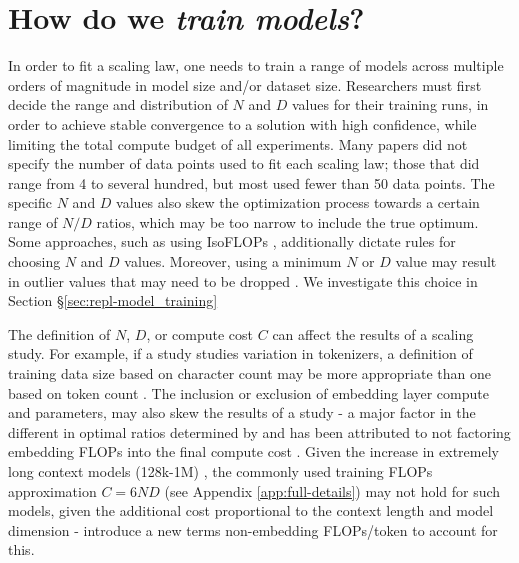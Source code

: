 
\section{How do we \emph{train models}?}\label{sec:model_training}



In order to fit a scaling law, one needs to train a range of models across multiple orders of magnitude in model size and/or dataset size. Researchers must first decide the range and distribution of $N$ and $D$ values for their training runs, in order to achieve stable convergence to a solution with high confidence, while limiting the total compute budget of all experiments. Many papers did not specify the number of data points used to fit each scaling law; those that did range from 4 to several hundred, but most used fewer than 50 data points. The specific $N$ and $D$ values also skew the optimization process towards a certain range of $N/D$ ratios, which may be too narrow to include the true optimum. Some approaches, such as using IsoFLOPs \citep{hoffmann2022training}, additionally dictate rules for choosing $N$ and $D$ values. Moreover, using a minimum $N$ or $D$ value may result in outlier values that may need to be dropped \citep{porian2024resolving,shin2023scaling,henighan2020scaling}. We investigate this choice in Section \S\ref{sec:repl-model_training}

The definition of $N$, $D$, or compute cost $C$ can affect the results of a scaling study. For example, if a study studies variation in tokenizers, a definition of training data size based on character count may be more appropriate than one based on token count \citep{tao2024scaling}. The inclusion or exclusion of embedding layer compute and parameters, may also skew the results of a study - a major factor in the different in optimal ratios determined by \cite{kaplan2020scaling} and \cite{hoffmann2022training} has been attributed to not factoring embedding FLOPs into the final compute cost \citep{pearce2024reconcilingkaplanchinchillascaling, porian2024resolving}. Given the increase in extremely long context models (128k-1M) \cite{reid2024gemini}, the commonly used training FLOPs approximation $C = 6 ND$ (see Appendix \ref{app:full-details}) may not hold for such models, given the additional cost proportional to the context length and model dimension - \citet{bi2024deepseek} introduce a new terms non-embedding FLOPs/token to account for this.

